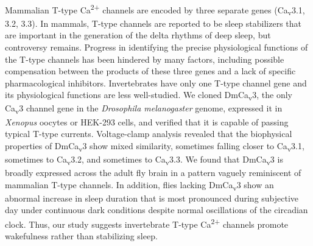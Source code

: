 Mammalian T-type Ca\textsuperscript{2+} channels are encoded by three separate genes (Ca\textsubscript{v}3.1, 3.2, 3.3).
In mammals, T-type channels are reported to be sleep stabilizers that are important in the generation of the delta rhythms of deep sleep, but controversy remains.
Progress in identifying the precise physiological functions of the T-type channels has been hindered by many factors, including possible compensation between the products of these three genes and a lack of specific pharmacological inhibitors.
Invertebrates have only one T-type channel gene and its physiological functions are less well-studied.
We cloned DmCa\textsubscript{v}3, the only Ca\textsubscript{v}3 channel gene in the \emph{Drosophila melanogaster} genome, expressed it in \emph{Xenopus} oocytes or HEK-293 cells, and verified that it is capable of passing typical T-type currents.
Voltage-clamp analysis revealed that the biophysical properties of DmCa\textsubscript{v}3 show mixed similarity, sometimes falling closer to Ca\textsubscript{v}3.1, sometimes to Ca\textsubscript{v}3.2, and sometimes to Ca\textsubscript{v}3.3.
We found that DmCa\textsubscript{v}3 is broadly expressed across the adult fly brain in a pattern vaguely reminiscent of mammalian T-type channels.
In addition, flies lacking DmCa\textsubscript{v}3 show an abnormal increase in sleep duration that is most pronounced during subjective day under continuous dark conditions despite normal oscillations of the circadian clock.
Thus, our study suggests invertebrate T-type Ca\textsuperscript{2+} channels promote wakefulness rather than stabilizing sleep.
